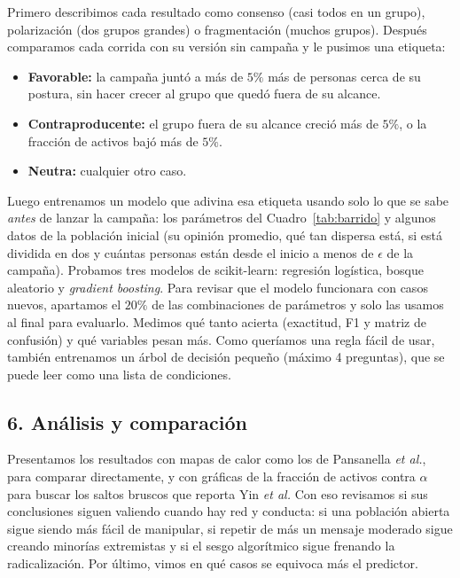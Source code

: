 \documentclass[11pt]{article}
\begin{document}
Primero describimos cada resultado como consenso (casi todos en un grupo), polarización (dos grupos
grandes) o fragmentación (muchos grupos). Después comparamos cada corrida con su versión sin campaña
y le pusimos una etiqueta:

\begin{itemize}
	\item \textbf{Favorable:} la campaña juntó a más de $5\%$ más de personas cerca de su postura, sin
	      hacer crecer al grupo que quedó fuera de su alcance.
	\item \textbf{Contraproducente:} el grupo fuera de su alcance creció más de $5\%$, o la fracción de
	      activos bajó más de $5\%$.
	\item \textbf{Neutra:} cualquier otro caso.
\end{itemize}

Luego entrenamos un modelo que adivina esa etiqueta usando solo lo que se sabe \emph{antes} de lanzar
la campaña: los parámetros del Cuadro~\ref{tab:barrido} y algunos datos de la población inicial (su
opinión promedio, qué tan dispersa está, si está dividida en dos y cuántas personas están desde el
inicio a menos de $\epsilon$ de la campaña). Probamos tres modelos de scikit-learn: regresión
logística, bosque aleatorio y \emph{gradient boosting}. Para revisar que el modelo funcionara con
casos nuevos, apartamos el $20\%$ de las combinaciones de parámetros y solo las usamos al final para
evaluarlo. Medimos qué tanto acierta (exactitud, F1 y matriz de confusión) y qué variables pesan más.
Como queríamos una regla fácil de usar, también entrenamos un árbol de decisión pequeño (máximo 4
preguntas), que se puede leer como una lista de condiciones.

\subsection*{6. Análisis y comparación}

Presentamos los resultados con mapas de calor como los de Pansanella \emph{et al.}, para comparar
directamente, y con gráficas de la fracción de activos contra $\alpha$ para buscar los saltos bruscos
que reporta Yin \emph{et al.} Con eso revisamos si sus conclusiones siguen valiendo cuando hay red y
conducta: si una población abierta sigue siendo más fácil de manipular, si repetir de más un mensaje
moderado sigue creando minorías extremistas y si el sesgo algorítmico sigue frenando la
radicalización. Por último, vimos en qué casos se equivoca más el predictor.
\end{document}
